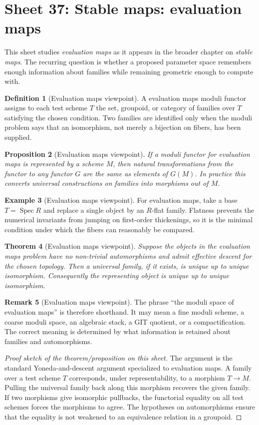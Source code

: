 \documentclass[11pt]{amsart}
\newtheorem{theorem}{Theorem}[section]
\newtheorem{proposition}[theorem]{Proposition}
\theoremstyle{definition}
\newtheorem{definition}[theorem]{Definition}
\newtheorem{example}[theorem]{Example}
\newtheorem{remark}[theorem]{Remark}
\newcommand{\Spec}{\operatorname{Spec}}
\begin{document}
\section{Sheet 37: Stable maps: evaluation maps}
This sheet studies \emph{evaluation maps} as it appears in the broader chapter on \emph{stable maps}.  The recurring question is whether a proposed parameter space remembers enough information about families while remaining geometric enough to compute with.
\begin{definition}[Evaluation maps viewpoint]
A evaluation maps moduli functor assigns to each test scheme $T$ the set, groupoid, or category of families over $T$ satisfying the chosen condition.  Two families are identified only when the moduli problem says that an isomorphism, not merely a bijection on fibers, has been supplied.
\end{definition}
\begin{proposition}[Evaluation maps viewpoint]
If a moduli functor for evaluation maps is represented by a scheme $M$, then natural transformations from the functor to any functor $G$ are the same as elements of $G(M)$.  In practice this converts universal constructions on families into morphisms out of $M$.
\end{proposition}
\begin{example}[Evaluation maps viewpoint]
For evaluation maps, take a base $T=\Spec R$ and replace a single object by an $R$-flat family.  Flatness prevents the numerical invariants from jumping on first-order thickenings, so it is the minimal condition under which the fibers can reasonably be compared.
\end{example}
\begin{theorem}[Evaluation maps viewpoint]
Suppose the objects in the evaluation maps problem have no non-trivial automorphisms and admit effective descent for the chosen topology.  Then a universal family, if it exists, is unique up to unique isomorphism.  Consequently the representing object is unique up to unique isomorphism.
\end{theorem}
\begin{remark}[Evaluation maps viewpoint]
The phrase ``the moduli space of evaluation maps'' is therefore shorthand.  It may mean a fine moduli scheme, a coarse moduli space, an algebraic stack, a GIT quotient, or a compactification.  The correct meaning is determined by what information is retained about families and automorphisms.
\end{remark}
\begin{proof}[Proof sketch of the theorem/proposition on this sheet]
The argument is the standard Yoneda-and-descent argument specialized to evaluation maps.  A family over a test scheme $T$ corresponds, under representability, to a morphism $T\to M$.  Pulling the universal family back along this morphism recovers the given family.  If two morphisms give isomorphic pullbacks, the functorial equality on all test schemes forces the morphisms to agree.  The hypotheses on automorphisms ensure that the equality is not weakened to an equivalence relation in a groupoid.
\end{proof}
\end{document}
